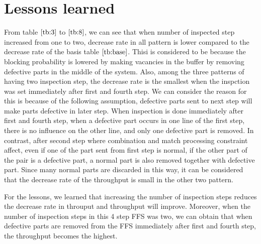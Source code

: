 \section{Lessons learned}
From table $\ref{tb:3}$ to $\ref{tb:8}$, we can see that when number of inspected step increased from one to two, decrease rate in all pattern is lower compared to the decrease rate of the basis table $\ref{tb:base}$.
Thisi is considered to be because the blocking probability is lowered by making vacancies in the buffer by removing defective parts in the middle of the system.
Also, among the three patterns of having two inspection step, the decrease rate is the smallest when the inspction was set immediately after first and fourth step.
We can consider the reason for this is because of the following assumption, defective parts sent to next step will make parts defective in later step.
When inspection is done immediately after first and fourth step, when a defective part occurs in one line of the first step, there is no influence on the other line, and only one defective part is removed.
In contrast, after second step where combination and match processing constraint affect, even if one of the part sent from first step is normal, if the other part of the pair is a defective part, a normal part is also removed together with defective part.
Since many normal parts are discarded in this way, it can be considered that the decrease rate of the throughput is small in the other two pattern.

For the lessons, we learned that increasing the number of inspection steps reduces the decrease rate in throuput and throughput will improve.
Moreover, when the number of inspection steps in this 4 step FFS was two, we can obtain that when defective parts are removed from the FFS immediately after first and fourth step, the throughput becomes the highest.








